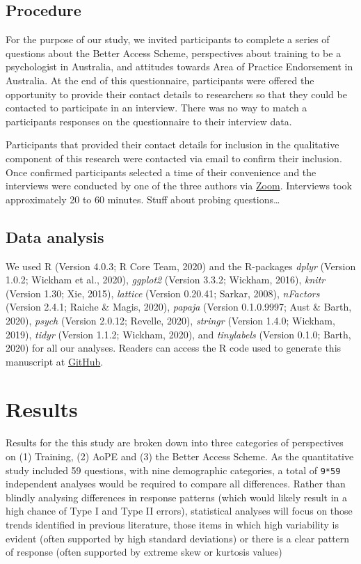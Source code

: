\documentclass[
  english,
  man]{apa6}
\begin{document}
\hypertarget{procedure}{%
\subsection{Procedure}\label{procedure}}

For the purpose of our study, we invited participants to complete a series of questions about the Better Access Scheme, perspectives about training to be a psychologist in Australia, and attitudes towards Area of Practice Endorsement in Australia. At the end of this questionnaire, participants were offered the opportunity to provide their contact details to researchers so that they could be contacted to participate in an interview. There was no way to match a participants responses on the questionnaire to their interview data.

Participants that provided their contact details for inclusion in the qualitative component of this research were contacted via email to confirm their inclusion. Once confirmed participants selected a time of their convenience and the interviews were conducted by one of the three authors via \href{https://zoom.us/}{Zoom}. Interviews took approximately 20 to 60 minutes. Stuff about probing questions\ldots{}

\hypertarget{data-analysis}{%
\subsection{Data analysis}\label{data-analysis}}

We used R (Version 4.0.3; R Core Team, 2020) and the R-packages \emph{dplyr} (Version 1.0.2; Wickham et al., 2020), \emph{ggplot2} (Version 3.3.2; Wickham, 2016), \emph{knitr} (Version 1.30; Xie, 2015), \emph{lattice} (Version 0.20.41; Sarkar, 2008), \emph{nFactors} (Version 2.4.1; Raiche \& Magis, 2020), \emph{papaja} (Version 0.1.0.9997; Aust \& Barth, 2020), \emph{psych} (Version 2.0.12; Revelle, 2020), \emph{stringr} (Version 1.4.0; Wickham, 2019), \emph{tidyr} (Version 1.1.2; Wickham, 2020), and \emph{tinylabels} (Version 0.1.0; Barth, 2020) for all our analyses. Readers can access the R code used to generate this manuscript at \href{https://github.com/jakekraska/psychtraining}{GitHub}.

\hypertarget{results}{%
\section{Results}\label{results}}

Results for the this study are broken down into three categories of perspectives on (1) Training, (2) AoPE and (3) the Better Access Scheme. As the quantitative study included 59 questions, with nine demographic categories, a total of \texttt{9*59} independent analyses would be required to compare all differences. Rather than blindly analysing differences in response patterns (which would likely result in a high chance of Type I and Type II errors), statistical analyses will focus on those trends identified in previous literature, those items in which high variability is evident (often supported by high standard deviations) or there is a clear pattern of response (often supported by extreme skew or kurtosis values)
\end{document}
